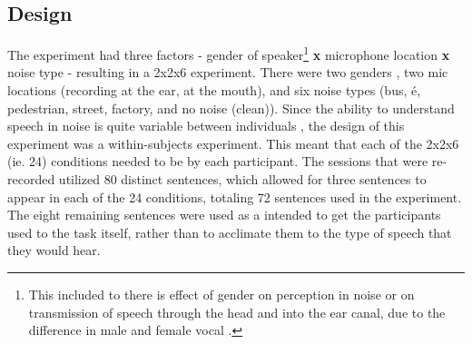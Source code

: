 \DIFaddbegin {}


\DIFaddend \subsection{Design}
\DIFdelbegin %
\DIFdelend \DIFaddbegin \label{chap3:methods:design}
\DIFaddend 

The experiment had three factors - gender of speaker\footnote{This \DIFdelbegin {}\DIFdelend \DIFaddbegin {}\DIFaddend included to \DIFdelbegin {}\DIFdelend \DIFaddbegin {}\DIFaddend there is \DIFdelbegin {}\DIFdelend \DIFaddbegin {}\DIFaddend effect of gender \DIFaddbegin {}\DIFaddend on \DIFaddbegin {}\DIFaddend perception in noise or on transmission of speech through the head and into the ear canal, due to the difference in male and female vocal \DIFdelbegin {}\DIFdelend \DIFaddbegin {}\DIFaddend .} \textbf{x} microphone location \textbf{x} noise type - resulting in a 2x2x6 experiment.  There were two genders \DIFaddbegin {}\DIFaddend , two mic locations (recording at the ear, \DIFdelbegin {}\DIFdelend \DIFaddbegin {}\DIFaddend at the mouth), and six noise types (bus, \DIFdelbegin {}\DIFdelend \DIFaddbegin {}\'{e}\DIFaddend , pedestrian, street, factory, and no noise (clean)).  Since the ability to understand speech in noise is quite variable between individuals \DIFaddbegin {}\DIFaddend , the design of this experiment was a within-subjects experiment.  This meant that each of the 2x2x6 (ie. 24) conditions needed to be \DIFdelbegin {}\DIFdelend \DIFaddbegin {}\DIFaddend by each participant.  The sessions that were re-recorded utilized 80 distinct sentences, which allowed for three sentences to appear in each of the 24 conditions, totaling 72 sentences used in the experiment.  The eight remaining sentences were used as a \DIFdelbegin {}\DIFdelend \DIFaddbegin {}\DIFaddend intended to get the participants used to the task itself, rather than to acclimate them to the type of speech that they would hear.

